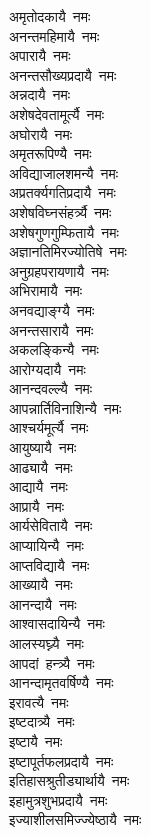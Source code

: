 \begin{multicols}{\maxColumns}
\begin{flushleft}
अमृतोदकायै~नमः\\
अनन्तमहिमायै~नमः\\
अपारायै~नमः\hfill{}\\
अनन्तसौख्यप्रदायै~नमः\\
अन्नदायै~नमः\\
अशेषदेवतामूर्त्यै~नमः\\
अघोरायै~नमः\\
अमृतरूपिण्यै~नमः\\
अविद्याजालशमन्यै~नमः\\
अप्रतर्क्यगतिप्रदायै~नमः\\
अशेषविघ्नसंहर्त्र्यै~नमः\\
अशेषगुणगुम्फितायै~नमः\\
अज्ञानतिमिरज्योतिषे~नमः\hfill{}\\
अनुग्रहपरायणायै~नमः\\
अभिरामायै~नमः\\
अनवद्याङ्ग्यै~नमः\\
अनन्तसारायै~नमः\\
अकलङ्किन्यै~नमः\\
आरोग्यदायै~नमः\\
आनन्दवल्ल्यै~नमः\\
आपन्नार्तिविनाशिन्यै~नमः\\
आश्चर्यमूर्त्यै~नमः\\
आयुष्यायै~नमः\hfill{}\\
आढ्यायै~नमः\\
आद्यायै~नमः\\
आप्रायै~नमः\\
आर्यसेवितायै~नमः\\
आप्यायिन्यै~नमः\\
आप्तविद्यायै~नमः\\
आख्यायै~नमः\\
आनन्दायै~नमः\\
आश्वासदायिन्यै~नमः\\
आलस्यघ्न्यै~नमः\hfill{}\\
आपदां~हन्त्र्यै~नमः\\
आनन्दामृतवर्षिण्यै~नमः\\
इरावत्यै~नमः\\
इष्टदात्र्यै~नमः\\
इष्टायै~नमः\\
इष्टापूर्तफलप्रदायै~नमः\\
इतिहासश्रुतीड्यार्थायै~नमः\\
इहामुत्रशुभप्रदायै~नमः\\
इज्याशीलसमिज्ज्येष्ठायै~नमः\\

\end{flushleft}
\end{multicols}
